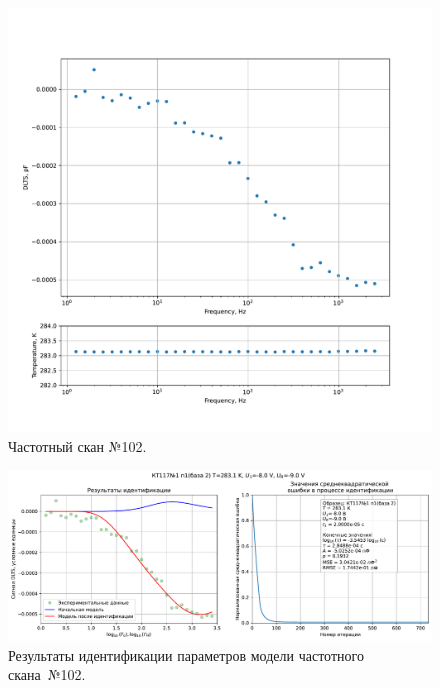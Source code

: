 \begin{figure}[!ht]
    \centering
    \includegraphics[width=1\textwidth]{../plots/КТ117№1_п1(база 2)_2500Гц-1Гц_1пФ_+10С_-8В-9В_10мВ_20мкс_шаг_0,1.pdf}
    \caption{Частотный скан №102.}
    \label{pic:frequency_scan_102}
\end{figure}

\begin{figure}[!ht]
    \centering
    \includegraphics[width=1\textwidth]{../plots/КТ117№1_п1(база 2)_2500Гц-1Гц_1пФ_+10С_-8В-9В_10мВ_20мкс_шаг_0,1_model.pdf}
    \caption{Результаты идентификации параметров модели частотного скана~№102.}
    \label{pic:frequency_scan_model102}
\end{figure}

\pagebreak


